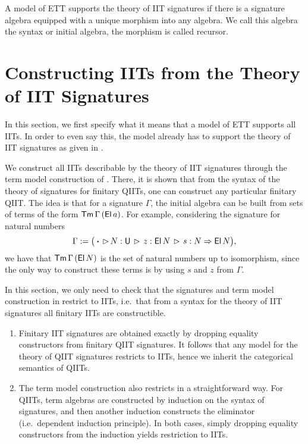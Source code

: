 \documentclass[a4paper,UKenglish,cleveref, autoref]{lipics-v2019}
\begin{document}
\begin{definition}\label{def:theoryofsignatures}
  A model of ETT supports the theory of IIT signatures if there is a
  signature algebra equipped with a unique morphism into any
  algebra. We call this algebra the syntax or initial algebra, the
  morphism is called recursor.
\end{definition}


\section{Constructing IITs from the Theory of IIT Signatures}
\label{sec:constructingiits}

In this section, we first specify what it means that a model of ETT
supports all IITs. In order to even say this, the model already has to
support the theory of IIT signatures as given in
. 

We construct all IITs describable by the theory of IIT signatures through the
term model construction of \cite{Kaposi:2019:CQI:3302515.3290315}. There, it is
shown that from the syntax of the theory of signatures for finitary QIITs, one
can construct any particular finitary QIIT. The idea is that for a signature
$\Gamma$, the initial algebra can be built from sets of terms of the form
$\mathsf{Tm}\,\Gamma\,(\mathsf{El}\,a)$. For example, considering the signature for natural
numbers
\[
  \Gamma := \big(\boldsymbol{\cdot}\,\rhd\,N:\mathsf{U}\,\rhd\,z : \mathsf{El}\,N\,\rhd\,s : N \Rightarrow \mathsf{El}\,N\big),
\]
we have that $\mathsf{Tm}\,\Gamma\,(\mathsf{El}\,N)$ is the set of natural numbers up to isomorphism,
since the only way to construct these terms is by using $s$ and $z$ from $\Gamma$.

In this section, we only need to check that the signatures and term model
construction in \cite{Kaposi:2019:CQI:3302515.3290315} restrict to IITs,
i.e.\ that from a syntax for the theory of IIT signatures all finitary IITs are
constructible.

\begin{enumerate}
\item
  Finitary IIT signatures are obtained exactly by dropping equality constructors from
  finitary QIIT signatures. It follows that any model for the theory of QIIT signatures
  restricts to IITs, hence we inherit the categorical semantics of QIITs.
\item
  The term model construction also restricts in a straightforward way. For QIITs,
  term algebras are constructed by induction on the syntax of signatures, and
  then another induction constructs the eliminator (i.e.\ dependent induction
  principle). In both cases, simply dropping equality constructors from the
  induction yields restriction to IITs.
\end{enumerate}
\end{document}
